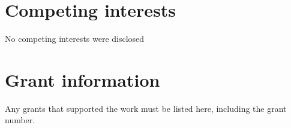 \documentclass[9pt,a4paper,]{extarticle}
\begin{document}
\hypertarget{competing-interests}{%
\section{Competing interests}\label{competing-interests}}

No competing interests were disclosed

\hypertarget{grant-information}{%
\section{Grant information}\label{grant-information}}

Any grants that supported the work must be listed here, including the grant number.

\renewcommand\refname{Acknowledgements}
{\small}
\end{document}
